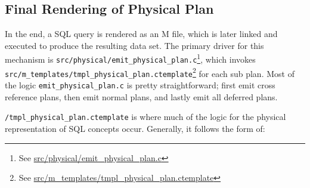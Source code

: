 \documentclass[]{article}
\def\code#1{\texttt{#1}}
\newcommand{\gitlab}[1]{\footnote{See \href{https://gitlab.com/YottaDB/DBMS/YDBOcto/blob/master/#1}{#1}}}
\begin{document}
\subsection{Final Rendering of Physical Plan}

In the end, a SQL query is rendered as an M file, which is later linked and executed to produce the resulting data set.
The primary driver for this mechanism is \code{src/physical/emit\_physical\_plan.c}\gitlab{src/physical/emit\_physical\_plan.c}, which invokes \code{src/m\_templates/tmpl\_physical\_plan.ctemplate}\gitlab{src/m\_templates/tmpl\_physical\_plan.ctemplate} for each sub plan.
Most of the logic \code{emit\_physical\_plan.c} is pretty straightforward; first emit cross reference plans, then emit normal plans, and lastly emit all deferred plans.

\code{/tmpl\_physical\_plan.ctemplate} is where much of the logic for the physical representation of SQL concepts occur.
Generally, it follows the form of:
\end{document}
